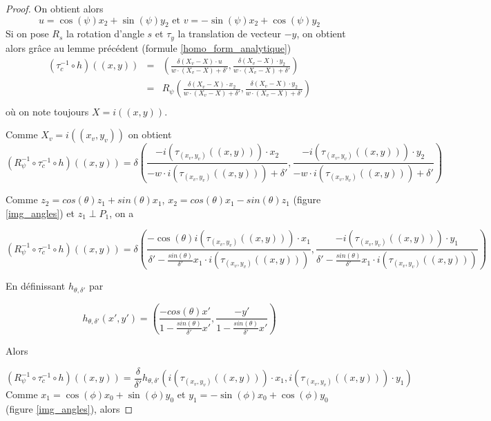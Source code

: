 \begin{proof}
On obtient alors
\begin{equation*}
u=\cos(\psi)x_{2}+\sin(\psi)y_{2} \text{ et } v=-\sin(\psi)x_{2}+\cos(\psi)y_{2}
\end{equation*}
Si on pose $R_{s}$ la rotation d'angle $s$ et $\tau_{y}$ la translation de vecteur $-y$, on obtient alors grâce au lemme précédent (formule \ref{homo_form_analytique})
\begin{eqnarray*}
(\tau_{c}^{-1} \circ h)((x,y)) &=& \left(\frac{\delta (X_v-X)\cdot u }{w \cdot (X_v-X)+\delta'},\frac{\delta (X_v-X)\cdot y_{2}}{w \cdot (X_v-X)+\delta'}  \right) \\
                           &=& R_{\psi}\left(\frac{\delta (X_v-X)\cdot x_{2} }{w \cdot (X_v-X)+\delta'},\frac{\delta (X_v-X)\cdot y_{2}}{w \cdot (X_v-X)+\delta'}  \right) \\
\end{eqnarray*}
où on note toujours $X = i((x,y))$.

Comme $X_{v}=i((x_v,y_v))$ on obtient
\begin{equation*}
(R_{\psi}^{-1} \circ \tau_{c}^{-1}  \circ h)((x,y))=\delta \left(\frac{-i(\tau_{(x_v,y_v)} ((x,y)))\cdot x_{2} }{-w \cdot i(\tau_{(x_v,y_v)} ((x,y)))+\delta'},\frac{-i(\tau_{(x_v,y_v)} ((x,y)))\cdot y_{2}}{-w \cdot i(\tau_{(x_v,y_v)} ((x,y)))+\delta'}  \right) 
\end{equation*}

Comme $z_{2}=cos(\theta)z_{1}+sin(\theta)x_{1}$, $x_{2}=cos(\theta)x_{1}-sin(\theta)z_{1}$ (figure \ref{img_angles}) et $z_{1}\perp P_{1}$, on a

\begin{equation*}
(R_{\psi}^{-1} \circ \tau_{c}^{-1}  \circ h)((x,y))=\delta\left(\frac{-\cos(\theta)i(\tau_{(x_v,y_v)} ((x,y)))\cdot x_{1} }{\delta'-\frac{sin(\theta)}{\delta'}x_{1}\cdot i(\tau_{(x_v,y_v)}((x,y)))}, \frac{-i(\tau_{(x_v,y_v)} ((x,y)))\cdot y_{1}}{\delta'-\frac{sin(\theta)}{\delta'}x_{1}\cdot i(\tau_{(x_v,y_v)}((x,y)))}  \right) 
\end{equation*}

En définissant $h_{\theta,\delta'}$ par

\begin{equation*}
h_{\theta,\delta'}(x',y')=\left(\frac{-cos(\theta)x'}{1-\frac{sin(\theta)}{\delta'}x'} ,\frac{-y'}{1-\frac{sin(\theta)}{\delta'}x'}\right)
\end{equation*}

Alors 

\begin{equation*}
(R_{\psi}^{-1} \circ \tau_{c}^{-1} \circ h)((x,y))= \frac{\delta}{\delta'}h_{\theta,\delta'}\left ( i(\tau_{(x_v,y_v)}((x,y))) \cdot x_{1}, i(\tau_{(x_v,y_v)}((x,y))) \cdot y_{1}\right)
\end{equation*}
\label{figure_de_rotations_18}
Comme $x_{1}=\cos(\phi)x_{0}+\sin(\phi)y_{0}$ et $y_{1}=-\sin(\phi)x_{0}+\cos(\phi)y_{0}$ (figure \ref{img_angles}), alors


\end{proof}
